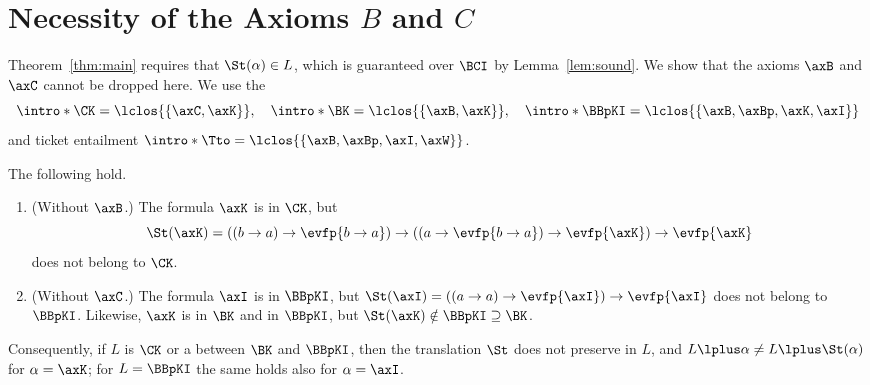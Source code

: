 \section{Necessity of the Axioms \texorpdfstring{$B$}{B} and \texorpdfstring{$C$}{C}}\label{app:weak}

Theorem~\ref{thm:main} requires that $\St(\alpha)\in L$, which is
guaranteed over $\BCI$ by Lemma~\ref{lem:sound}. We show that the axioms
$\axB$ and $\axC$ cannot be dropped here. \AP We use the 
\[
\intro*\CK=\lclos{\{\axC,\axK\}},\quad
\intro*\BK=\lclos{\{\axB,\axK\}},\quad
\intro*\BBpKI=\lclos{\{\axB,\axBp,\axK,\axI\}}
\]
and ticket entailment $\intro*\Tto=\lclos{\{\axB,\axBp,\axI,\axW\}}$.

\begin{proposition}\label{prop:weak}
The following hold.
\begin{enumerate}
\item[(a)] (Without $\axB$.) The formula $\axK$ is  in $\CK$, but
  \[
  \St(\axK)=((b\to a)\to \evfp{b\to a})\to((a\to \evfp{b\to a})\to \evfp{\axK})\to \evfp{\axK}
  \]
  does not belong to $\CK$.
\item[(b)] (Without $\axC$.) The formula $\axI$ is  in $\BBpKI$,
  but $\St(\axI)=((a\to a)\to \evfp{\axI})\to \evfp{\axI}$ does not belong to
  $\BBpKI$. Likewise, $\axK$ is  in $\BK$ and in $\BBpKI$, but
  ${\St(\axK)\notin\BBpKI\supseteq\BK}$.
\end{enumerate}
Consequently, if $L$ is $\CK$ or a  between $\BK$ and $\BBpKI$,
then the translation $\St$ does not preserve  in $L$, and
$L\lplus\alpha\ne L\lplus\St(\alpha)$ for $\alpha=\axK$; for $L=\BBpKI$ the
same holds also for $\alpha=\axI$.
\end{proposition}
